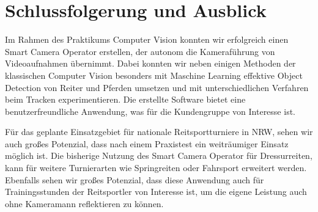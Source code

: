\chapter{Schlussfolgerung und Ausblick}
\label{ch:zusammenfassung}


Im Rahmen des Praktikums Computer Vision konnten wir erfolgreich einen Smart Camera Operator erstellen, der autonom die Kameraführung von Videoaufnahmen übernimmt. Dabei konnten wir neben einigen Methoden der klassischen Computer Vision besonders mit Maschine Learning effektive Object Detection von Reiter und Pferden umsetzen und mit unterschiedlichen Verfahren beim Tracken experimentieren. Die erstellte Software bietet eine benutzerfreundliche Anwendung, was für die Kundengruppe von Interesse ist.

Für das geplante Einsatzgebiet für nationale Reitsportturniere in NRW, sehen wir auch großes Potenzial, dass nach einem Praxistest ein weiträumiger Einsatz möglich ist. Die bisherige Nutzung des Smart Camera Operator für Dressurreiten, kann für weitere Turnierarten wie Springreiten oder Fahrsport erweitert werden. Ebenfalls sehen wir großes Potenzial, dass diese Anwendung auch für Trainingsstunden der Reitsportler von Interesse ist, um die eigene Leistung auch ohne Kameramann reflektieren zu können.